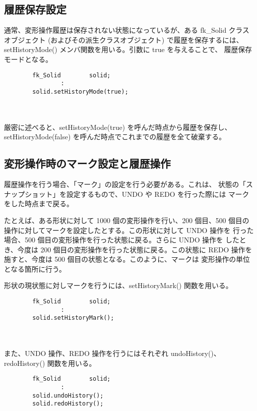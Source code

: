 \subsection{履歴保存設定} \label{subsec:shapehistory}
通常、変形操作履歴は保存されない状態になっているが、ある fk\_Solid クラス	オブジェクト (およびその派生クラスオブジェクト) で履歴を保存するには、
setHistoryMode() メンバ関数を用いる。引数に true を与えることで、
履歴保存モードとなる。\\
\begin{screen}
\begin{verbatim}
        fk_Solid        solid;
                :
        solid.setHistoryMode(true);
\end{verbatim}
\end{screen} \\ ~ \\
厳密に述べると、setHistoryMode(true) を呼んだ時点から履歴を保存し、
setHistoryMode(false) を呼んだ時点でこれまでの履歴を全て破棄する。

\subsection{変形操作時のマーク設定と履歴操作}
履歴操作を行う場合、「マーク」の設定を行う必要がある。これは、
状態の「スナップショット」を設定するもので、UNDO や REDO を行った際には
マークをした時点まで戻る。

たとえば、ある形状に対して 1000 個の変形操作を行い、200 個目、500 個目の
操作に対してマークを設定したとする。この形状に対して UNDO 操作を
行った場合、500 個目の変形操作を行った状態に戻る。さらに UNDO 操作を
したとき、今度は 200 個目の変形操作を行った状態に戻る。この状態に
REDO 操作を施すと、今度は 500 個目の状態となる。このように、マークは
変形操作の単位となる箇所に行う。

形状の現状態に対しマークを行うには、setHistoryMark() 関数を用いる。\\
\begin{screen}
\begin{verbatim}
        fk_Solid        solid;
                :
        solid.setHistoryMark();
\end{verbatim}
\end{screen} \\ ~ \\
また、UNDO 操作、REDO 操作を行うにはそれぞれ undoHistory()、
redoHistory() 関数を用いる。\\
\begin{screen}
\begin{verbatim}
        fk_Solid        solid;
                :
        solid.undoHistory();
        solid.redoHistory();
\end{verbatim}
\end{screen}
